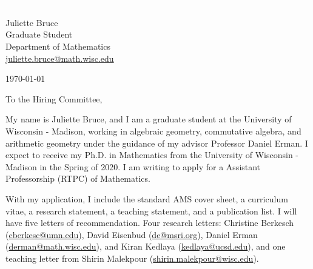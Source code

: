 \documentclass[11pt]{article}
\begin{document}
\section*{}

\noindent
\begin{minipage}{0.99\textwidth}
\begin{minipage}{0.69\textwidth}
\textcolor{white}{.}
\end{minipage}
\begin{minipage}{0.29\textwidth}
{
Juliette Bruce \\
Graduate Student \\
Department of Mathematics \\
\href{mailto:juliette.bruce@math.wisc.edu}{juliette.bruce@math.wisc.edu}
}

\vspace{12pt}
\today
\end{minipage}
\end{minipage}


\vspace{12pt}
\noindent
To the Hiring Committee,

My name is Juliette Bruce, and I am a graduate student at the University of Wisconsin - Madison, working in algebraic geometry, commutative algebra, and arithmetic geometry under the guidance of my advisor Professor Daniel Erman. I expect to receive my Ph.D. in Mathematics from the University of Wisconsin - Madison in the Spring of 2020. I am writing to apply for a Assistant Professorship (RTPC) of Mathematics. 

With my application, I include the standard AMS cover sheet, a curriculum vitae, a research statement, a teaching statement, and a publication list. I will have five letters of recommendation. Four research letters: Christine Berkesch (\href{mailto:cberkesc@umn.edu}{cberkesc@umn.edu}), David Eisenbud (\href{mailto:de@msri.org}{de@msri.org}), Daniel Erman (\href{mailto:derman@math.wisc.edu}{derman@math.wisc.edu}), and Kiran Kedlaya (\href{mailto:kedlaya@ucsb.edu}{kedlaya@ucsd.edu}), and one teaching letter from Shirin Malekpour (\href{mailto:shirin.malekpour@wisc.edu}{shirin.malekpour@wisc.edu}).
\end{document}
